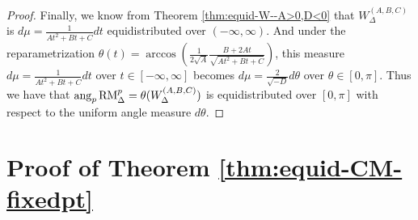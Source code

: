 \documentclass[11pt,letterpaper,reqno]{amsart}
\numberwithin{equation}{section}
\numberwithin{figure}{section}
\numberwithin{table}{section}
\newcommand{\lrp}[1]{\left(#1\right)}
\newcommand{\RM}{\textnormal{RM}}
\begin{document}
\begin{proof}
Finally, we know from Theorem \ref{thm:equid-W--A>0,D<0} that $W_{\Delta}^{(A,B,C)}$ is $d\mu = \frac{1}{At^2+Bt+C} dt$ equidistributed over  $(-\infty,\infty)$. And under the reparametrization $\theta(t) = \arccos\lrp{\frac{1}{2\sqrt A}\frac{B+2At}{\sqrt{A t^2 + Bt + C}}}$, this measure
$d\mu = \frac{1}{At^2+Bt+C} dt$ over $t \in [-\infty,\infty]$ becomes $d\mu = \frac{2}{\sqrt{-D}}  d\theta$ over $\theta \in [0,\pi]$. Thus we have that $\mathrm{ang}_p\, \RM^{p}_{\Delta} = \theta(W_{\Delta}^{(A,B,C)})$ is equidistributed over $[0,\pi]$ with respect to the uniform angle measure $d\theta$.
\end{proof}







\section{Proof of Theorem \ref{thm:equid-CM-fixedpt}} \label{sec:proof-of-thm-equid-CM-fixedpt}
\end{document}

